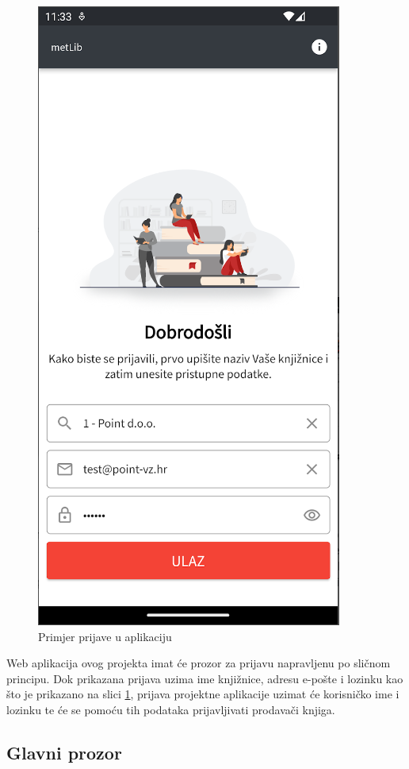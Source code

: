 	\begin{figure}[H]
		\includegraphics[scale=0.4]{slike/Login.PNG} %
		\centering
		\caption{Primjer prijave u aplikaciju}
		\label{fig:prijava}
	\end{figure}
	
	Web aplikacija ovog projekta imat će prozor za prijavu napravljenu po sličnom principu. Dok prikazana prijava uzima ime knjižnice, adresu e-pošte i lozinku kao što je prikazano na slici \ref{fig:prijava}, prijava projektne aplikacije uzimat će korisničko ime i lozinku te će se pomoću tih podataka prijavljivati prodavači knjiga.
		
	\subsection{Glavni prozor}
	
